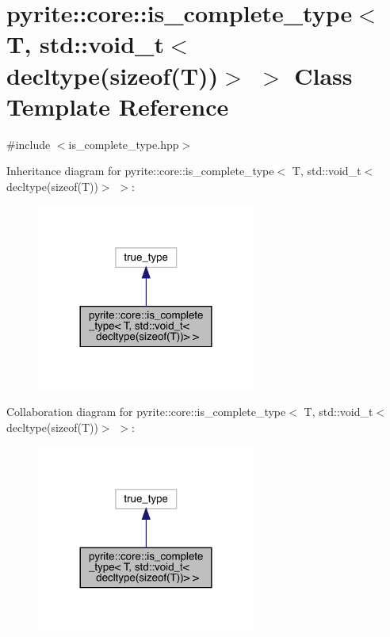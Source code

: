 \hypertarget{classpyrite_1_1core_1_1is__complete__type_3_01_t_00_01std_1_1void__t_3_01decltype_07sizeof_07_t_08_08_4_01_4}{}\section{pyrite\+:\+:core\+:\+:is\+\_\+complete\+\_\+type$<$ T, std\+:\+:void\+\_\+t$<$ decltype(sizeof(T))$>$ $>$ Class Template Reference}
\label{classpyrite_1_1core_1_1is__complete__type_3_01_t_00_01std_1_1void__t_3_01decltype_07sizeof_07_t_08_08_4_01_4}


{\ttfamily \#include $<$is\+\_\+complete\+\_\+type.\+hpp$>$}



Inheritance diagram for pyrite\+:\+:core\+:\+:is\+\_\+complete\+\_\+type$<$ T, std\+:\+:void\+\_\+t$<$ decltype(sizeof(T))$>$ $>$\+:
\nopagebreak
\begin{figure}[H]
\begin{center}
\leavevmode
\includegraphics[width=204pt]{df/dae/classpyrite_1_1core_1_1is__complete__type_3_01_t_00_01std_1_1void__t_3_01decltype_07sizeof_07_t_08_08_4_01_4__inherit__graph}
\end{center}
\end{figure}


Collaboration diagram for pyrite\+:\+:core\+:\+:is\+\_\+complete\+\_\+type$<$ T, std\+:\+:void\+\_\+t$<$ decltype(sizeof(T))$>$ $>$\+:
\nopagebreak
\begin{figure}[H]
\begin{center}
\leavevmode
\includegraphics[width=204pt]{da/d64/classpyrite_1_1core_1_1is__complete__type_3_01_t_00_01std_1_1void__t_3_01decltype_07sizeof_07_t_08_08_4_01_4__coll__graph}
\end{center}
\end{figure}


